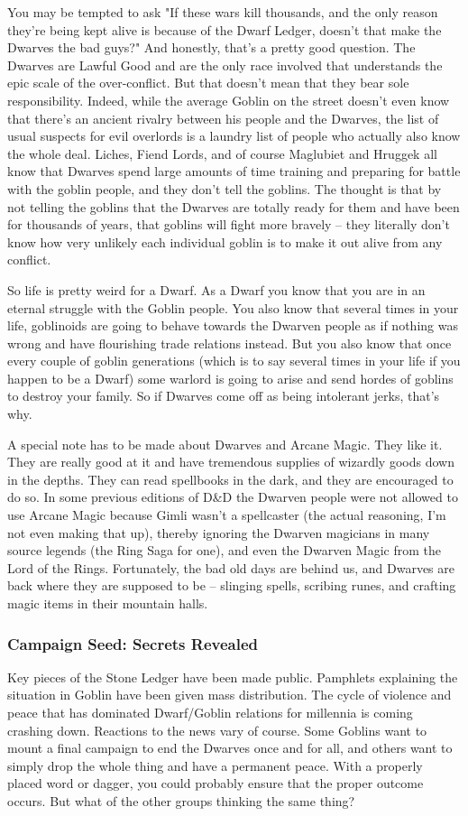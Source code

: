 You may be tempted to ask "If these wars kill thousands, and the only reason they're being kept alive is because of the Dwarf Ledger, doesn't that make the Dwarves the bad guys?" And honestly, that's a pretty good question. The Dwarves are Lawful Good and are the only race involved that understands the epic scale of the over-conflict. But that doesn't mean that they bear sole responsibility. Indeed, while the average Goblin on the street doesn't even know that there's an ancient rivalry between his people and the Dwarves, the list of usual suspects for evil overlords is a laundry list of people who actually also know the whole deal. Liches, Fiend Lords, and of course Maglubiet and Hruggek all know that Dwarves spend large amounts of time training and preparing for battle with the goblin people, and they don't tell the goblins. The thought is that by not telling the goblins that the Dwarves are totally ready for them and have been for thousands of years, that goblins will fight more bravely -- they literally don't know how very unlikely each individual goblin is to make it out alive from any conflict.

So life is pretty weird for a Dwarf. As a Dwarf you know that you are in an eternal struggle with the Goblin people. You also know that several times in your life, goblinoids are going to behave towards the Dwarven people as if nothing was wrong and have flourishing trade relations instead. But you also know that once every couple of goblin generations (which is to say several times in your life if you happen to be a Dwarf) some warlord is going to arise and send hordes of goblins to destroy your family. So if Dwarves come off as being intolerant jerks, that's why.

A special note has to be made about Dwarves and Arcane Magic. They like it. They are really good at it and have tremendous supplies of wizardly goods down in the depths. They can read spellbooks in the dark, and they are encouraged to do so. In some previous editions of D\&D the Dwarven people were not allowed to use Arcane Magic because Gimli wasn't a spellcaster (the actual reasoning, I'm not even making that up), thereby ignoring the Dwarven magicians in many source legends (the Ring Saga for one), and even the Dwarven Magic from the Lord of the Rings. Fortunately, the bad old days are behind us, and Dwarves are back where they are supposed to be -- slinging spells, scribing runes, and crafting magic items in their mountain halls.

\subsubsection{Campaign Seed: Secrets Revealed}
Key pieces of the Stone Ledger have been made public. Pamphlets explaining the situation in Goblin have been given mass distribution. The cycle of violence and peace that has dominated Dwarf/Goblin relations for millennia is coming crashing down. Reactions to the news vary of course. Some Goblins want to mount a final campaign to end the Dwarves once and for all, and others want to simply drop the whole thing and have a permanent peace. With a properly placed word or dagger, you could probably ensure that the proper outcome occurs. But what of the other groups thinking the same thing?

